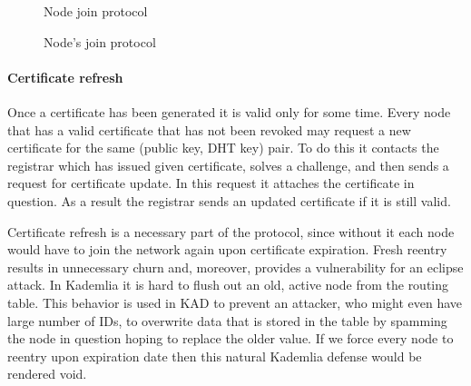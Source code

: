 \begin{figure}[tbp]
\begin{msc}{Node join protocol}
\setlength{\instdist}{5.5cm}
\setlength{\envinstdist}{3cm}
\setlength{\instwidth}{2.5cm}
\nextlevel
{}
\nextlevel[5]
\nextlevel
{}
\nextlevel[1]


\nextlevel[6]


\nextlevel


\nextlevel[2]
\nextlevel[1]
\end{msc}
\caption{Node's join protocol}
\label{fig:node_join_prot}
\end{figure}

\paragraph{Certificate refresh} Once a certificate has been generated it is
valid only for some time. Every node that has a valid certificate that has not
been revoked may request a new certificate for the same (public key, DHT key)
pair.
To do this it contacts the registrar which has issued given certificate,
solves a challenge, and then sends a request for certificate update.
In this request it attaches the certificate in question. As a result the
registrar sends an updated certificate if it is still valid.

Certificate refresh is a necessary part of the protocol, since without it each
node would have to join the network again upon certificate expiration.
Fresh reentry results in unnecessary churn and, moreover, provides a
vulnerability for an eclipse attack. 
In Kademlia it is hard to flush out an old, active node from the routing table.
This behavior is used in KAD to prevent an attacker, who might even have large
number of IDs, to overwrite data that is stored in the table by spamming the
node in question hoping to replace the older value. If we force every node to
reentry upon expiration date then this natural Kademlia defense would be
rendered void.

